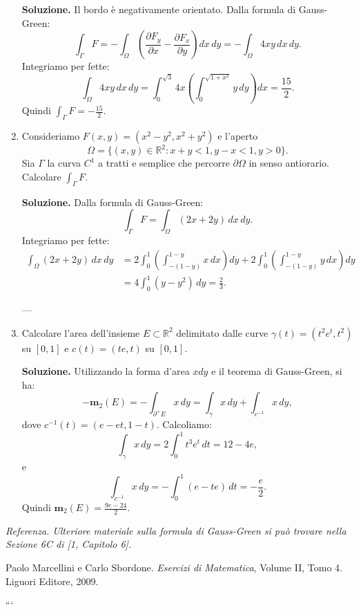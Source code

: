 \begin{enumerate}
	\textbf{Soluzione.}
		Il bordo è negativamente orientato. Dalla formula di Gauss-Green:
		\[
		\int_{\Gamma} F = -\int_{\Omega} \left(\frac{\partial F_y}{\partial x} - \frac{\partial F_x}{\partial y}\right) dx \, dy = -\int_{\Omega} 4xy \, dx \, dy.
		\]
		Integriamo per fette:
		\[
		\int_{\Omega} 4xy \, dx \, dy = \int_0^{\sqrt{3}} 4x \left(\int_0^{\sqrt{1 + x^2}} y \, dy\right) dx = \frac{15}{2}.
		\]
		Quindi $\int_{\Gamma} F = -\frac{15}{2}$.
	
	
	\item Consideriamo $F(x,y) = (x^2 - y^2, x^2 + y^2)$ e l'aperto
	\[
	\Omega = \{(x,y) \in \mathbb{R}^2 : x + y < 1, y - x < 1, y > 0\}.
	\]
	Sia $\Gamma$ la curva $C^1$ a tratti e semplice che percorre $\partial \Omega$ in senso antiorario. Calcolare $\int_{\Gamma} F$.
	
	\textbf{Soluzione.}
		Dalla formula di Gauss-Green:
		\[
		\int_{\Gamma} F = \int_{\Omega} (2x + 2y) \, dx \, dy.
		\]
		Integriamo per fette:
		\[
		\begin{aligned}
			\int_{\Omega} (2x + 2y) \, dx \, dy &= 2 \int_0^1 \left(\int_{-(1-y)}^{1-y} x \, dx\right) dy + 2 \int_0^1 \left(\int_{-(1-y)}^{1-y} y \, dx\right) dy \\
			&= 4 \int_0^1 (y - y^2) \, dy = \frac{2}{3}.
		\end{aligned}
		\]
	
	
	---
	
	\item Calcolare l'area dell'insieme $E \subset \mathbb{R}^2$ delimitato dalle curve $\gamma(t) = (t^2 e^t, t^2)$ su $[0,1]$ e $c(t) = (te, t)$ su $[0,1]$.
	
	\textbf{Soluzione.}
		Utilizzando la forma d'area $x dy$ e il teorema di Gauss-Green, si ha:
		\[
		-\mathbf{m}_2(E) = -\int_{\partial^+ E} x \, dy = \int_{\gamma} x \, dy + \int_{c^{-1}} x \, dy,
		\]
		dove $c^{-1}(t) = (e - et, 1 - t)$. Calcoliamo:
		\[
		\int_{\gamma} x \, dy = 2 \int_0^1 t^3 e^t \, dt = 12 - 4e,
		\]
		e
		\[
		\int_{c^{-1}} x \, dy = -\int_0^1 (e - te) \, dt = -\frac{e}{2}.
		\]
		Quindi $\mathbf{m}_2(E) = \frac{9e - 24}{2}$.
	
\end{enumerate}




\textit{Referenza. Ulteriore materiale sulla formula di Gauss-Green si può trovare nella Sezione 6C di [1, Capitolo 6].}

\begin{thebibliography}{1}
	Paolo Marcellini e Carlo Sbordone.
	\textit{Esercizi di Matematica}, Volume II, Tomo 4.
	Liguori Editore, 2009.
\end{thebibliography}
```